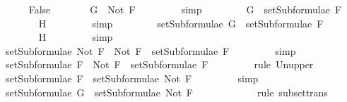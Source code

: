 \begin{isabellebody}
\isanewline
\ \ \ \ \isamarkupfalse%
\ False\isanewline
\ \ \ \ \isamarkupfalse%
\ \isamarkupfalse%
\ {\isachardoublequoteopen}G\ {\isasymnoteq}\ Not\ F{\isachardoublequoteclose}\ \isanewline
\ \ \ \ \ \ \isamarkupfalse%
\ simp\ %
\isanewline
\ \ \ \ \isamarkupfalse%
\ \isamarkupfalse%
\ {\isachardoublequoteopen}G\ {\isasymin}\ setSubformulae\ F{\isachardoublequoteclose}\ \isanewline
\ \ \ \ \ \ \isamarkupfalse%
\ H{}\ \isanewline
\ \ \ \ \ \ \isamarkupfalse%
\ simp\ %
\isanewline
\ \ \ \ \isamarkupfalse%
\ \isamarkupfalse%
\ {}{\isacharcolon}{\isachardoublequoteopen}setSubformulae\ G\ {\isasymsubseteq}\ setSubformulae\ F{\isachardoublequoteclose}\ \isanewline
\ \ \ \ \ \ \isamarkupfalse%
\ H{}\ \isanewline
\ \ \ \ \ \ \isamarkupfalse%
\ simp\ %
\isanewline
\ \ \ \ \isamarkupfalse%
\ {\isachardoublequoteopen}setSubformulae\ {\isacharparenleft}Not\ F{\isacharparenright}\ {\isacharequal}\ {\isacharbraceleft}Not\ F{\isacharbraceright}\ {\isasymunion}\ setSubformulae\ F{\isachardoublequoteclose}\ \isanewline
\ \ \ \ \ \ \isamarkupfalse%
\ simp\ %
\isanewline
\ \ \ \ \isamarkupfalse%
\ {\isachardoublequoteopen}setSubformulae\ F\ {\isasymsubseteq}\ {\isacharbraceleft}Not\ F{\isacharbraceright}\ {\isasymunion}\ setSubformulae\ F{\isachardoublequoteclose}\ \isanewline
\ \ \ \ \ \ \isamarkupfalse%
\ {\isacharparenleft}rule\ Un{\isacharunderscore}upper{}{\isacharparenright}\isanewline
\ \ \ \ \isamarkupfalse%
\ \isamarkupfalse%
\ {}{\isacharcolon}{\isachardoublequoteopen}setSubformulae\ F\ {\isasymsubseteq}\ setSubformulae\ {\isacharparenleft}Not\ F{\isacharparenright}{\isachardoublequoteclose}\ \isanewline
\ \ \ \ \ \ \isamarkupfalse%
\ simp\ %
\isanewline
\ \ \ \ \isamarkupfalse%
\ {\isachardoublequoteopen}setSubformulae\ G\ {\isasymsubseteq}\ setSubformulae\ {\isacharparenleft}Not\ F{\isacharparenright}{\isachardoublequoteclose}\ \isanewline
\ \ \ \ \ \ \isamarkupfalse%
\ {}\ {}\ \isamarkupfalse%
\ {\isacharparenleft}rule\ subset{\isacharunderscore}trans{\isacharparenright}\isanewline
\ \ \isamarkupfalse%

\end{isabellebody}
